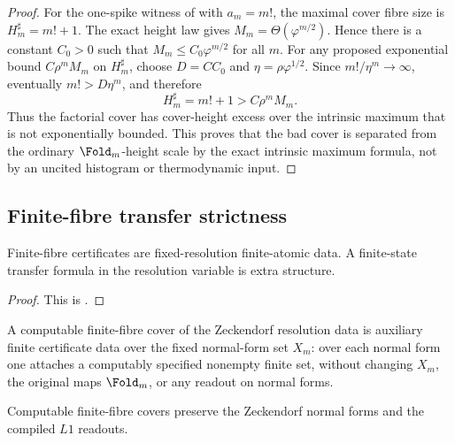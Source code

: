 \begin{proof}
For the one-spike witness of  with
\(a_m=m!\), the maximal cover fibre size is \(H_m^\sharp=m!+1\).  The exact height
law gives \(M_m=\Theta(\varphi^{m/2})\).  Hence there is a constant \(C_0>0\) such
that \(M_m\le C_0\varphi^{m/2}\) for all \(m\).  For any proposed exponential bound
\(C\rho^mM_m\) on \(H_m^\sharp\), choose \(D=C C_0\) and
\(\eta=\rho\varphi^{1/2}\).  Since \(m!/\eta^m\to\infty\), eventually
\(m!>D\eta^m\), and therefore
\[
  H_m^\sharp=m!+1>C\rho^mM_m .
\]
Thus the factorial cover has cover-height excess over the intrinsic maximum that
is not exponentially bounded.  This proves that the bad cover is separated from
the ordinary \(\Fold_m\)-height scale by the exact intrinsic maximum formula, not
by an uncited histogram or thermodynamic input.
\end{proof}


\subsection{Finite-fibre transfer strictness}

\begin{proposition}
\label{prop:L2-generic-vs-structural}
Finite-fibre certificates are fixed-resolution finite-atomic data.  A
finite-state transfer formula in the resolution variable is extra structure.
\end{proposition}

\begin{proof}
This is .
\end{proof}

\begin{definition}
\label{def:computable-cover}
A computable finite-fibre cover of the Zeckendorf resolution data is auxiliary
finite certificate data over the fixed normal-form set \(X_m\): over each normal
form one attaches a computably specified nonempty finite set, without changing
\(X_m\), the original maps \(\Fold_m\), or any readout on normal forms.
\end{definition}

\begin{lemma}
\label{lem:cover-preserves-protocol}
Computable finite-fibre covers preserve the Zeckendorf normal forms and the
compiled \(L1\) readouts.
\end{lemma}

